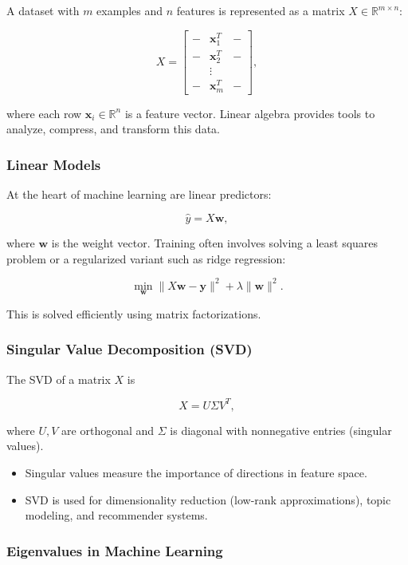 \documentclass[
  12pt,
  a4paper,
]{article}
\begin{document}
A dataset with \(m\) examples and \(n\) features is represented as a
matrix \(X \in \mathbb{R}^{m \times n}\):

\[X = 
\begin{bmatrix}
- & \mathbf{x}_1^T & - \\
- & \mathbf{x}_2^T & - \\
  & \vdots &  \\
- & \mathbf{x}_m^T & -
\end{bmatrix},\]

where each row \(\mathbf{x}_i \in \mathbb{R}^n\) is a feature vector.
Linear algebra provides tools to analyze, compress, and transform this
data.

\subsubsection{Linear Models}\label{linear-models}

At the heart of machine learning are linear predictors:

\[\hat{y} = X\mathbf{w},\]

where \(\mathbf{w}\) is the weight vector. Training often involves
solving a least squares problem or a regularized variant such as ridge
regression:

\[\min_{\mathbf{w}} \|X\mathbf{w} - \mathbf{y}\|^2 + \lambda \|\mathbf{w}\|^2.\]

This is solved efficiently using matrix factorizations.

\subsubsection{Singular Value Decomposition
(SVD)}\label{singular-value-decomposition-svd}

The SVD of a matrix \(X\) is

\[X = U \Sigma V^T,\]

where \(U, V\) are orthogonal and \(\Sigma\) is diagonal with
nonnegative entries (singular values).

\begin{itemize}
\item
  Singular values measure the importance of directions in feature space.
\item
  SVD is used for dimensionality reduction (low-rank approximations),
  topic modeling, and recommender systems.
\end{itemize}

\subsubsection{Eigenvalues in Machine
Learning}\label{eigenvalues-in-machine-learning}
\end{document}
